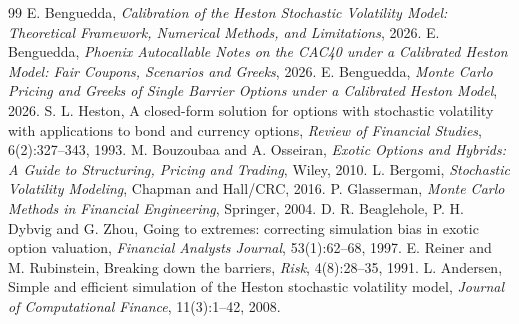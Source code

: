 \documentclass[11pt,a4paper]{article}
\begin{document}
\begin{thebibliography}{99}
 E. Benguedda, \emph{Calibration of the Heston Stochastic Volatility Model: Theoretical
Framework, Numerical Methods, and Limitations}, 2026.
 E. Benguedda, \emph{Phoenix Autocallable Notes on the CAC40 under a Calibrated Heston
Model: Fair Coupons, Scenarios and Greeks}, 2026.
 E. Benguedda, \emph{Monte Carlo Pricing and Greeks of Single Barrier Options under a
Calibrated Heston Model}, 2026.
 S. L. Heston, A closed-form solution for options with stochastic volatility with applications
to bond and currency options, \emph{Review of Financial Studies}, 6(2):327--343, 1993.
 M. Bouzoubaa and A. Osseiran, \emph{Exotic Options and Hybrids: A Guide to Structuring,
Pricing and Trading}, Wiley, 2010.
 L. Bergomi, \emph{Stochastic Volatility Modeling}, Chapman and Hall/CRC, 2016.
 P. Glasserman, \emph{Monte Carlo Methods in Financial Engineering}, Springer, 2004.
 D. R. Beaglehole, P. H. Dybvig and G. Zhou, Going to extremes: correcting simulation bias
in exotic option valuation, \emph{Financial Analysts Journal}, 53(1):62--68, 1997.
 E. Reiner and M. Rubinstein, Breaking down the barriers, \emph{Risk}, 4(8):28--35, 1991.
 L. Andersen, Simple and efficient simulation of the Heston stochastic volatility model,
\emph{Journal of Computational Finance}, 11(3):1--42, 2008.
\end{thebibliography}
\end{document}
